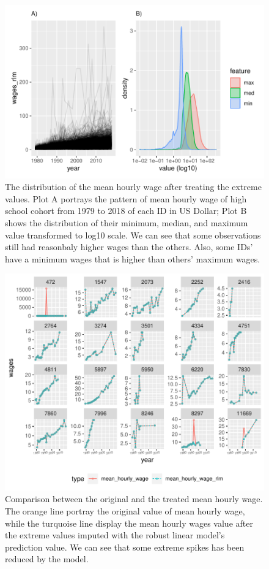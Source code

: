 \documentclass{article}
\begin{document}
\begin{figure}
\centering
\includegraphics{figures/comppict-1.pdf}
\caption{The distribution of the mean hourly wage after treating the extreme values. Plot A portrays the pattern of mean hourly wage of high school cohort from 1979 to 2018 of each ID in US Dollar; Plot B shows the distribution of their minimum, median, and maximum value transformed to log10 scale. We can see that some observations still had reasonbaly higher wages than the others. Also, some IDs' have a minimum wages that is higher than others' maximum wages.}
\end{figure}

\begin{figure}
\centering
\includegraphics{figures/compare-1.pdf}
\caption{Comparison between the original and the treated mean hourly wage. The orange line portray the original value of mean hourly wage, while the turquoise line display the mean hourly wages value after the extreme values imputed with the robust linear model's prediction value. We can see that some extreme spikes has been reduced by the model.}
\end{figure}
\end{document}
